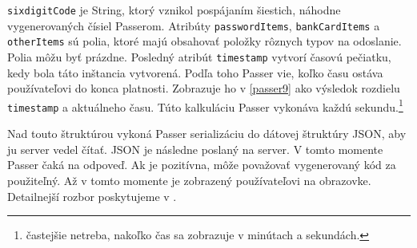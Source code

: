 \texttt{sixdigitCode} je String, ktorý vznikol pospájaním šiestich, náhodne vygenerovaných čísiel Passerom. Atribúty \texttt{passwordItems}, \texttt{bankCardItems} a \texttt{otherItems} sú polia, ktoré majú obsahovať položky rôznych typov na odoslanie. Polia môžu byť prázdne. Posledný atribút \texttt{timestamp} vytvorí časovú pečiatku, kedy bola táto inštancia vytvorená. Podľa toho Passer vie, koľko času ostáva používateľovi do konca platnosti. Zobrazuje ho v \figurename{ \ref{passer9}} ako výsledok rozdielu \texttt{timestamp} a aktuálneho času. Túto kalkuláciu Passer vykonáva každú sekundu.\footnote{častejšie netreba, nakoľko čas sa zobrazuje v minútach a sekundách.}

Nad touto štruktúrou vykoná Passer serializáciu do dátovej štruktúry JSON, aby ju server vedel čítať. JSON je následne poslaný na server. V tomto momente Passer čaká na odpoveď. Ak je pozitívna, môže považovať vygenerovaný kód za použiteľný. Až v tomto momente je zobrazený používateľovi na obrazovke. Detailnejší rozbor poskytujeme v .
